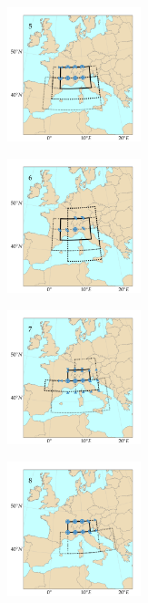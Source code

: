 \documentclass[twocol]{ametsoc}
\begin{document}
\begin{figure}[htb]
	\begin{subfigure}{.5\columnwidth}
		\centering
		\includegraphics[width=3.9cm]{figures/spatial_win_z4-hi4/Spatial_windows_5.png}
	\end{subfigure}%
	\begin{subfigure}{.5\columnwidth}
		\centering
		\includegraphics[width=3.9cm]{figures/spatial_win_z4-hi4/Spatial_windows_6.png}
	\end{subfigure}
	\begin{subfigure}{.5\columnwidth}
		\centering
		\includegraphics[width=3.9cm]{figures/spatial_win_z4-hi4/Spatial_windows_7.png}
	\end{subfigure}%
	\begin{subfigure}{.5\columnwidth}
		\centering
		\includegraphics[width=3.9cm]{figures/spatial_win_z4-hi4/Spatial_windows_8.png}
	\end{subfigure}
	\begin{subfigure}{.5\columnwidth}

\end{subfigure}
\end{figure}
\end{document}
